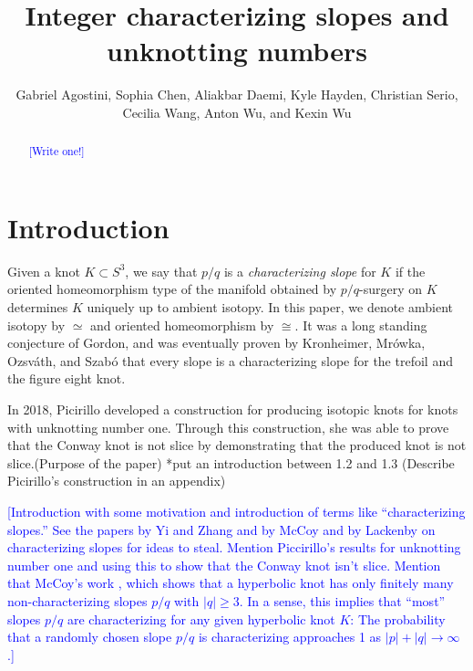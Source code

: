 \documentclass[11pt,usenames,dvipsnames,reqno]{amsart}
\numberwithin{theorem}{section}
\theoremstyle{ex}
\theoremstyle{rem}
\def\kh#1{\textcolor{Blue}{#1}}
\begin{document}


\title{Integer characterizing slopes and unknotting numbers}

\author[Agostini, Chen, Daemi, Hayden, Serio, Wang, A. Wu, and K. Wu]{Gabriel Agostini, Sophia Chen, Aliakbar Daemi, Kyle Hayden, Christian Serio, Cecilia Wang, Anton Wu, and Kexin Wu}



\begin{abstract} 
\kh{[Write one!]}
\end{abstract}


\maketitle

\section{Introduction}\label{sec:intro}

Given a knot $K\subset S^3$, we say that $p/q$  is a {\it characterizing slope} for $K$  if the oriented homeomorphism type of the manifold obtained by $p/q$-surgery on $K$ determines $K$ uniquely up to ambient isotopy. In this paper, we denote ambient isotopy by $\simeq$ and oriented homeomorphism by $\cong$.  
It was a long standing conjecture of Gordon, and was eventually proven by Kronheimer, Mr\'{o}wka, Ozsv\'{a}th, and Szab\'{o} that every slope is a characterizing slope for the trefoil and the figure eight knot. 


In 2018, Picirillo developed a construction for producing isotopic knots for knots with unknotting number one. Through this construction, she was able to prove that the Conway knot is not slice by demonstrating that the produced knot is not slice.(Purpose of the paper)
*put an introduction between 1.2 and 1.3 
(Describe Picirillo’s construction in an appendix) 


\kh{[Introduction with some motivation and introduction of terms like ``characterizing slopes.'' See the papers by Yi and Zhang and by McCoy and by Lackenby on characterizing slopes for ideas to steal. Mention Piccirillo's results for unknotting number one and using this to show that the Conway knot isn't slice. Mention that McCoy's work \cite{mccoy:hyperbolic}, which shows that a hyperbolic knot has only finitely many non-characterizing slopes $p/q$ with $|q| \geq 3$. In a sense, this implies that ``most'' slopes $p/q$ are characterizing for any given hyperbolic knot $K$: The  probability that a randomly chosen slope $p/q$ is characterizing approaches 1 as $|p|+|q|\to \infty$.]}
\end{document}

